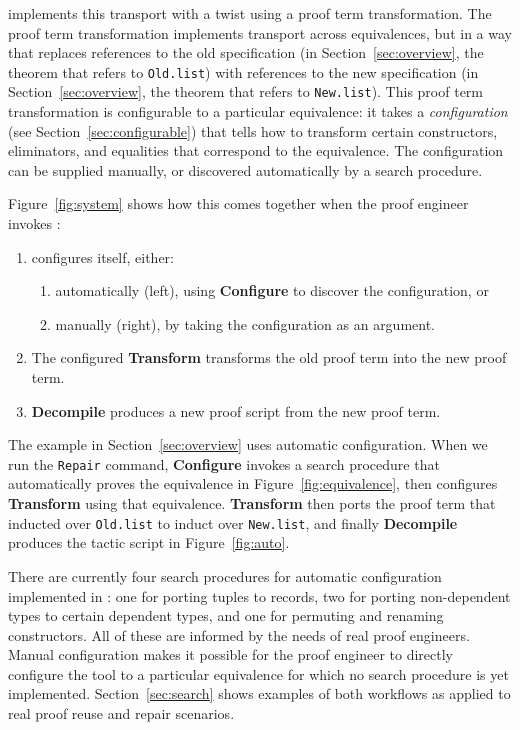 \toolname implements this transport with a twist using a proof term transformation.
The proof term transformation implements transport across equivalences,
but in a way that replaces references to the old specification (in Section~\ref{sec:overview}, the theorem that refers to \lstinline{Old.list})
with references to the new specification (in Section~\ref{sec:overview}, the theorem that refers to \lstinline{New.list}).
This proof term transformation is configurable to a particular equivalence:
it takes a \textit{configuration} (see Section~\ref{sec:configurable}) 
that tells \toolname how to transform certain constructors, eliminators, and equalities that 
correspond to the equivalence.
The configuration can be supplied manually, or discovered automatically by a search procedure.

Figure~\ref{fig:system} shows how this comes together when the proof engineer invokes \toolname:

\begin{enumerate}
\item \toolname configures itself, either:
\begin{enumerate}
\item automatically (left), using \textbf{Configure} to discover the configuration, or
\item manually (right), by taking the configuration as an argument.
\end{enumerate}
\item The configured \textbf{Transform} transforms the old proof term into the new proof term.
\item \textbf{Decompile} produces a new proof script from the new proof term.
\end{enumerate}

The example in Section~\ref{sec:overview} uses automatic configuration. When we run the \lstinline{Repair} command,
\textbf{Configure} invokes a search procedure that automatically proves the equivalence in Figure~\ref{fig:equivalence},
then configures \textbf{Transform} using that equivalence.
\textbf{Transform} then ports the proof term that inducted over \lstinline{Old.list}
to induct over \lstinline{New.list}, and finally
\textbf{Decompile} produces the tactic script in Figure~\ref{fig:auto}.

There are currently four search procedures for automatic configuration implemented in \toolname:
one for porting tuples to records, two for porting non-dependent types to certain dependent types, 
and one for permuting and renaming constructors.
All of these are informed by the needs of real proof engineers.
Manual configuration makes it possible for the proof engineer to directly configure the tool to a particular equivalence
for which no search procedure is yet implemented.
Section~\ref{sec:search} shows examples of both workflows as applied to real proof reuse and repair scenarios.




